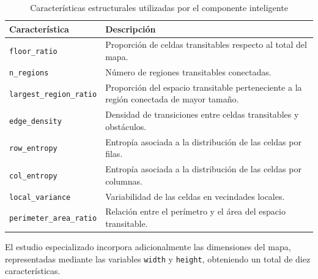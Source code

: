 \begin{table}[htbp]
	\centering
	
	\caption{Características estructurales utilizadas por el componente inteligente}
	\label{tab:caracteristicas_entrada_ml}
	
	\renewcommand{\arraystretch}{1.3}
	\small
	
	\begin{tabularx}{\textwidth}{
			|>{\raggedright\arraybackslash}p{4.5cm}|
			>{\raggedright\arraybackslash}X|
		}
		
		\hline
		
		\rowcolor{gray!15}
		\textbf{Característica} &
		\textbf{Descripción} \\ \hline
		
		\texttt{floor\_ratio} &
		Proporción de celdas transitables respecto
		al total del mapa. \\ \hline
		
		\texttt{n\_regions} &
		Número de regiones transitables conectadas.
		\\ \hline
		
		\texttt{largest\_region\_ratio} &
		Proporción del espacio transitable perteneciente
		a la región conectada de mayor tamaño. \\ \hline
		
		\texttt{edge\_density} &
		Densidad de transiciones entre celdas
		transitables y obstáculos. \\ \hline
		
		\texttt{row\_entropy} &
		Entropía asociada a la distribución de
		las celdas por filas. \\ \hline
		
		\texttt{col\_entropy} &
		Entropía asociada a la distribución de
		las celdas por columnas. \\ \hline
		
		\texttt{local\_variance} &
		Variabilidad de las celdas en
		vecindades locales. \\ \hline
		
		\texttt{perimeter\_area\_ratio} &
		Relación entre el perímetro y el área
		del espacio transitable. \\ \hline
		
	\end{tabularx}
	
\end{table}

\FloatBarrier

El estudio especializado incorpora adicionalmente las dimensiones del mapa, representadas mediante las variables \texttt{width} y \texttt{height}, obteniendo un total de diez características.

